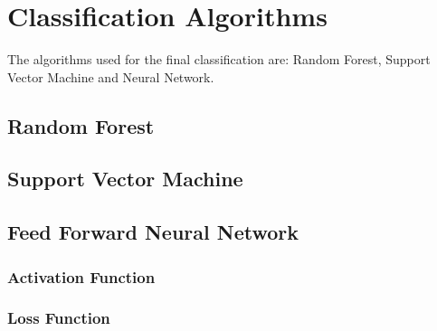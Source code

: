 \documentclass[LaM,binding=0.6cm]{sapthesis}
\begin{document}
%

\chapter{Classification Algorithms}
The algorithms used for the final classification are: Random Forest, Support Vector Machine and Neural Network.
\section{Random Forest}
\section{Support Vector Machine}
\section{Feed Forward Neural Network}
\subsection{Activation Function}
\subsection{Loss Function}
\end{document}
